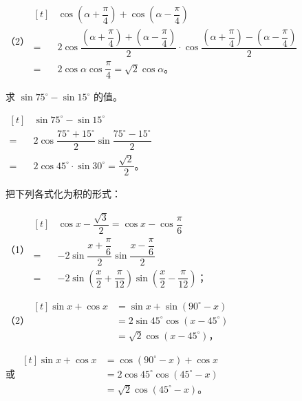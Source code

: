 （2）$\begin{aligned}[t]
    & \cos\left( \alpha + \dfrac{\pi}{4} \right) + \cos\left( \alpha - \dfrac{\pi}{4} \right) \\
    = & 2\cos\dfrac{\left( \alpha + \dfrac{\pi}{4} \right) + \left( \alpha - \dfrac{\pi}{4} \right)}{2} \cdot \cos\dfrac{\left( \alpha + \dfrac{\pi}{4} \right) - \left( \alpha - \dfrac{\pi}{4} \right)}{2} \\
    = & 2\cos\alpha \cos\dfrac{\pi}{4} = \sqrt{2} \cos\alpha \text{。}
\end{aligned}$\jiange

\liti 求 $\sin75^\circ - \sin15^\circ$ 的值。

\jie $\begin{aligned}[t]
    & \sin75^\circ - \sin15^\circ \\
    = & 2\cos\dfrac{75^\circ + 15^\circ}{2} \sin\dfrac{75^\circ - 15^\circ}{2} \\
    = & 2\cos45^\circ \cdot \sin30^\circ = \dfrac{\sqrt{2}}{2} \text{。}
\end{aligned}$\jiange

\liti 把下列各式化为积的形式：
\begin{xiaoxiaotis}

    \jiange
    \jiange

\end{xiaoxiaotis}

\jie （1）$\begin{aligned}[t]
    & \cos x - \dfrac{\sqrt{3}}{2} = \cos x - \cos\dfrac{\pi}{6} \\
    = & -2\sin\dfrac{x + \dfrac{\pi}{6}}{2} \sin\dfrac{x - \dfrac{\pi}{6}}{2} \\
    = & -2\sin\left( \dfrac{x}{2} + \dfrac{\pi}{12} \right) \sin\left( \dfrac{x}{2} - \dfrac{\pi}{12} \right) \text{；}
\end{aligned}$\jiange

（2）$\begin{aligned}[t]
    \sin x + \cos x &= \sin x + \sin(90^\circ - x) \\
    &= 2\sin45^\circ \cos(x - 45^\circ) \\
    &= \sqrt{2} \cos(x - 45^\circ) \text{，}
\end{aligned}$\jiange

或 \; $\begin{aligned}[t]
    \sin x + \cos x &= \cos(90^\circ - x) + \cos x \\
    &= 2\cos45^\circ \cos(45^\circ - x) \\
    &= \sqrt{2} \cos(45^\circ - x) \text{。}
\end{aligned}$\jiange

